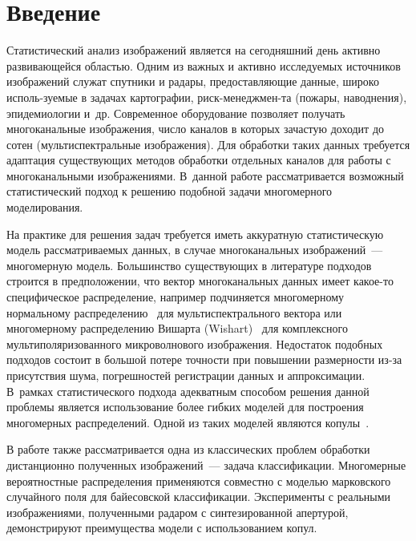       \begin{multicols}{2}

      \label{st\stat}


\section{Введение}


Статистический анализ изображений является на сегодняшний день активно развивающейся областью. 
Одним из важных и активно исследуемых источников изображений
служат спутники и радары, предоставляющие данные, широко исполь-\linebreak зуемые в задачах картографии, 
риск-менеджмен-\linebreak та (пожары, наводнения), эпидемиологии и~др.\linebreak
Современное оборудование позволяет получать многоканальные изображения, число каналов в 
которых зачастую доходит до сотен (мультиспектральные изображения).
Для обработки таких данных требуется адаптация существующих методов 
обработки отдельных каналов для работы с многоканальными изображениями. В~данной работе
рассматривается возможный статистический подход к решению подобной задачи многомерного моделирования.

На практике для решения задач требуется иметь аккуратную статистическую модель рас\-смат\-ри\-ва\-емых данных, 
в случае многоканальных изоб\-ра\-жений~--- многомерную модель. Большинство сущест\-ву\-ющих в литературе подходов 
строится в предположении, что вектор многоканальных данных имеет какое-то специфическое распределение,
например подчиняется многомерному нормальному распределению~\cite{Landgrebe} для мультиспектрального 
вектора или многомерному распределению Вишарта (Wishart)~\cite{2DNG} для комплексного мультиполяризованного 
микроволнового изображения. Недостаток подобных подходов состоит в большой потере точности при
повышении размерности из-за присутствия шума, погрешностей регистрации данных и аппроксимации. 
В~рамках статистического подхода адекватным способом решения данной
проблемы является использование более гибких моделей для построения многомерных распределений. 
Одной из таких моделей являются копулы~\cite{Nelsen}.

В работе также рассматривается одна из клас\-сиче\-ских проблем обработки дистанционно полученных изображений~--- 
задача классификации.\linebreak
Многомерные вероятностные распределения применяются совместно с моделью марковского случайного поля для 
байесовской классификации. Эксперименты с реальными изображениями, полученными радаром с синтезированной 
апертурой, демонстрируют преимущества модели с использованием копул.


\end{multicols}
